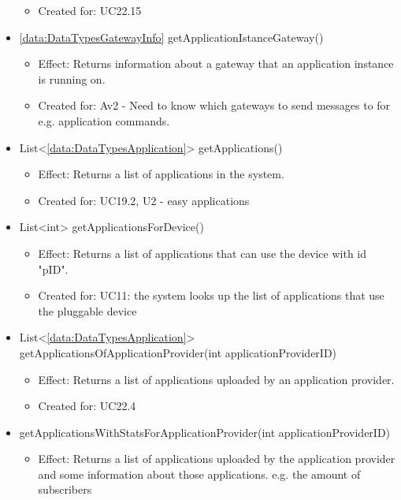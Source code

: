 \begin{description}
\begin{itemize}[noitemsep,nolistsep,leftmargin=-.25cm]
\begin{itemize}[noitemsep,nolistsep]
\item Created for: UC22.15
        \end{itemize}
      \item \textsf{\ref{data:DataTypesGatewayInfo} getApplicationIstanceGateway()}
        \begin{itemize}[noitemsep,nolistsep]
           \item Effect: Returns information about a gateway that an application instance is running on.
\item  Created for: Av2 - Need to know which gateways to send messages to for e.g. application commands.
        \end{itemize}
      \item \textsf{List\textless{}\ref{data:DataTypesApplication}\textgreater{} getApplications()}
        \begin{itemize}[noitemsep,nolistsep]
           \item Effect: Returns a list of applications in the system.
\item Created for: UC19.2, U2 - easy applications
        \end{itemize}
      \item \textsf{List\textless{}int\textgreater{} getApplicationsForDevice()}
        \begin{itemize}[noitemsep,nolistsep]
           \item Effect: Returns a list of applications that can use the device with id "pID".
\item Created for: UC11: the system looks up the list of applications that use the pluggable device
        \end{itemize}
      \item \textsf{List\textless{}\ref{data:DataTypesApplication}\textgreater{} getApplicationsOfApplicationProvider(int applicationProviderID)}
        \begin{itemize}[noitemsep,nolistsep]
           \item Effect: Returns a list of applications uploaded by an application provider.
\item Created for: UC22.4
        \end{itemize}
      \item \textsf{ getApplicationsWithStatsForApplicationProvider(int applicationProviderID)}
        \begin{itemize}[noitemsep,nolistsep]
           \item Effect: Returns a list of applications uploaded by the application provider and some information about those applications. e.g. the amount of subscribers

\end{itemize}
\end{itemize}
\end{description}
